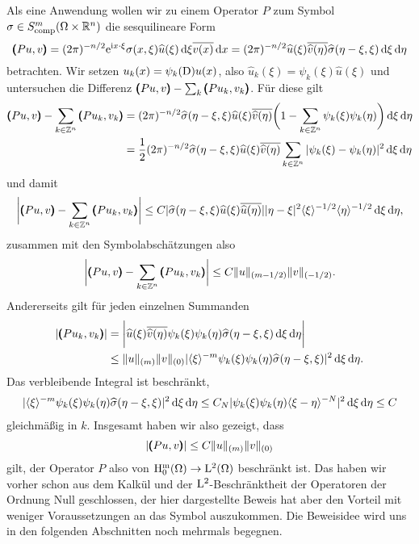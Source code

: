 Als eine Anwendung wollen wir zu einem Operator $P$ zum Symbol $\sigma\in S^m_{\rm comp} (\Omega\times\mathbb R^n)$ die sesquilineare Form
\begin{equation}
   \pmb(Pu,v\pmb) = (2\pi)^{-n/2} \relax \mathrm e^{\mathrm i x\cdot\xi} \sigma(x,\xi) \widehat u(\xi) \,\mathrm d\xi \overline{v(x)}\,\mathrm d x 
   = (2\pi)^{-n/2} \relax \widehat u(\xi) \overline{\widehat v(\eta)} \widehat\sigma(\eta-\xi,\xi) \,\mathrm d\xi\,\mathrm d\eta
\end{equation} 
betrachten. Wir setzen $u_k(x) = \psi_k(\mathrm D) u(x)$, also $\widehat u_k(\xi) = \psi_k(\xi) \widehat u(\xi)$ und untersuchen die Differenz 
$\pmb(Pu,v\pmb)-\sum_k \pmb(Pu_k,v_k\pmb)$. Für diese gilt
\begin{align}
       \pmb(Pu,v\pmb) -\sum_{k\in\mathbb Z^n} \pmb(Pu_k,v_k\pmb)  &= (2\pi)^{-n/2}  \relax \widehat\sigma (\eta-\xi,\xi) \widehat u(\xi) \overline{\widehat v(\eta)} \bigg( 1 - \sum_{k\in\mathbb Z^n} \psi_k(\xi)\psi_k(\eta)\bigg) \,\mathrm d\xi\,\mathrm d\eta  \notag\\
       &= \frac12 (2\pi)^{-n/2} \relax \widehat\sigma (\eta-\xi,\xi) \widehat u(\xi) \overline{\widehat v(\eta)}  \sum_{k\in\mathbb Z^n} | \psi_k(\xi)-\psi_k(\eta)|^2 \,\mathrm d\xi\,\mathrm d\eta 
\end{align}
und damit
\begin{equation}
   \bigg|\pmb(Pu,v\pmb) - \sum_{k\in\mathbb Z^n}\pmb(Pu_k,v_k\pmb)\bigg| \le C \relax | \widehat \sigma(\eta-\xi,\xi) \widehat u(\xi) \overline{\widehat u(\eta)}| |\eta-\xi|^2 \langle\xi\rangle^{-1/2} \langle\eta\rangle^{-1/2} \,\mathrm d\xi\,\mathrm d\eta, 
\end{equation}
zusammen mit den Symbolabschätzungen also
\begin{equation}
    \bigg|\pmb(Pu,v\pmb) - \sum_{k\in\mathbb Z^n}\pmb(Pu_k,v_k\pmb)\bigg| \le C \|u\|_{(m-1/2)} \|v\|_{(-1/2)}.
\end{equation}
 Andererseits gilt für jeden einzelnen Summanden
 \begin{align}
     |\pmb(Pu_k,v_k\pmb) | &= \bigg|\relax \widehat u(\xi) \overline{\widehat v(\eta)} \psi_k(\xi)\psi_k(\eta) \widehat\sigma(\eta-\xi,\xi) \,\mathrm d\xi\,\mathrm d\eta\bigg|
     \notag\\
     &\le \|u\|_{(m)}  \|v\|_{(0)} \relax | \langle\xi\rangle^{-m}\psi_k(\xi)\psi_k(\eta) \widehat\sigma(\eta-\xi,\xi)|^2 \,\mathrm d\xi\,\mathrm d\eta.
 \end{align}
Das verbleibende Integral ist beschränkt, 
\begin{align}
 \relax | \langle\xi\rangle^{-m}\psi_k(\xi)\psi_k(\eta) \widehat\sigma(\eta-\xi,\xi)|^2 \,\mathrm d\xi\,\mathrm d\eta 
 \le C_N  \relax | \psi_k(\xi)\psi_k(\eta) \langle \xi-\eta\rangle^{-N} |^2 \,\mathrm d\xi\,\mathrm d\eta \le C
\end{align}
gleichmäßig in $k$. Insgesamt haben wir also gezeigt, dass
\begin{equation}
   |\pmb(Pu,v\pmb)| \le C \|u\|_{(m)} \|v\|_{(0)}
\end{equation}
gilt, der Operator $P$ also von $\rm H^m_0(\Omega) \to \mathrm L^2(\Omega)$ beschränkt ist. Das haben wir vorher schon aus dem Kalkül und der $\mathrm L^2$-Beschränktheit der Operatoren der Ordnung Null geschlossen, der hier dargestellte Beweis hat aber den Vorteil mit weniger Voraussetzungen an das Symbol auszukommen. Die Beweisidee wird uns in den folgenden Abschnitten noch mehrmals begegnen.





